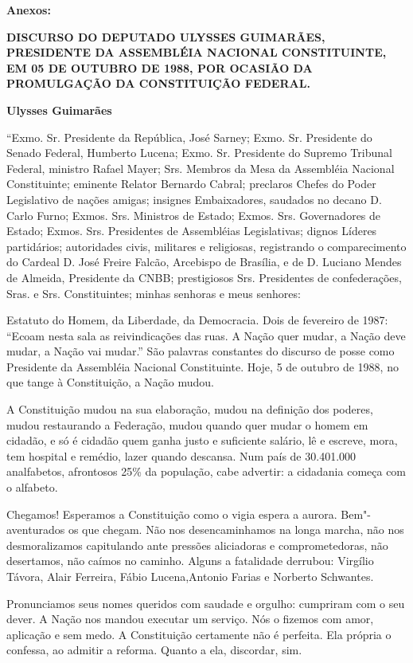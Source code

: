 \textbf{Anexos:}

\textbf{DISCURSO DO DEPUTADO ULYSSES GUIMARÃES, PRESIDENTE DA ASSEMBLÉIA
NACIONAL CONSTITUINTE, EM 05 DE OUTUBRO DE 1988, POR OCASIÃO DA
PROMULGAÇÃO DA CONSTITUIÇÃO FEDERAL.}

\textbf{Ulysses Guimarães}

``Exmo. Sr. Presidente da República, José Sarney; Exmo. Sr. Presidente
do Senado Federal, Humberto Lucena; Exmo. Sr. Presidente do Supremo
Tribunal Federal, ministro Rafael Mayer; Srs. Membros da Mesa da
Assembléia Nacional Constituinte; eminente Relator Bernardo Cabral;
preclaros Chefes do Poder Legislativo de nações amigas; insignes
Embaixadores, saudados no decano D. Carlo Furno; Exmos. Srs. Ministros
de Estado; Exmos. Srs. Governadores de Estado; Exmos. Srs. Presidentes
de Assembléias Legislativas; dignos Líderes partidários; autoridades
civis, militares e religiosas, registrando o comparecimento do Cardeal
D. José Freire Falcão, Arcebispo de Brasília, e de D. Luciano Mendes de
Almeida, Presidente da CNBB; prestigiosos Srs. Presidentes de
confederações, Sras. e Srs. Constituintes; minhas senhoras e meus
senhores:

Estatuto do Homem, da Liberdade, da Democracia. Dois de fevereiro de
1987: ``Ecoam nesta sala as reivindicações das ruas. A Nação quer mudar,
a Nação deve mudar, a Nação vai mudar.'' São palavras constantes do
discurso de posse como Presidente da Assembléia Nacional Constituinte.
Hoje, 5 de outubro de 1988, no que tange à Constituição, a Nação mudou.

A Constituição mudou na sua elaboração, mudou na definição dos poderes,
mudou restaurando a Federação, mudou quando quer mudar o homem em
cidadão, e só é cidadão quem ganha justo e suficiente salário, lê e
escreve, mora, tem hospital e remédio, lazer quando descansa. Num país
de 30.401.000 analfabetos, afrontosos 25\% da população, cabe advertir:
a cidadania começa com o alfabeto.

Chegamos! Esperamos a Constituição como o vigia espera a aurora.
Bem"-aventurados os que chegam. Não nos desencaminhamos na longa marcha,
não nos desmoralizamos capitulando ante pressões aliciadoras e
comprometedoras, não desertamos, não caímos no caminho. Alguns a
fatalidade derrubou: Virgílio Távora, Alair Ferreira, Fábio
Lucena,Antonio Farias e Norberto Schwantes.

Pronunciamos seus nomes queridos com saudade e orgulho: cumpriram com o
seu dever. A Nação nos mandou executar um serviço. Nós o fizemos com
amor, aplicação e sem medo. A Constituição certamente não é perfeita.
Ela própria o confessa, ao admitir a reforma. Quanto a ela, discordar,
sim.

